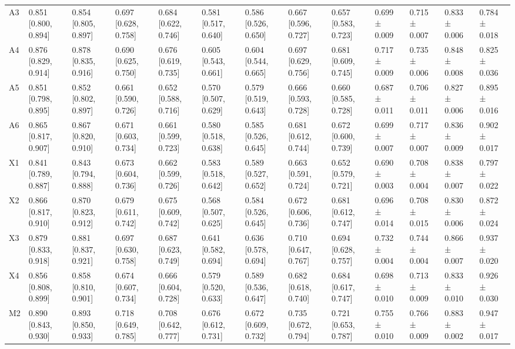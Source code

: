 \begin{table}
\begin{tabular}{lllllllllllll}
A3 & 0.851 [0.800, 0.894] & 0.854 [0.805, 0.897] & 0.697 [0.628, 0.758] & 0.684 [0.622, 0.746] & 0.581 [0.517, 0.640] & 0.586 [0.526, 0.650] & 0.667 [0.596, 0.727] & 0.657 [0.583, 0.723] & 0.699 ± 0.009 & 0.715 ± 0.007 & 0.833 ± 0.006 & 0.784 ± 0.018 \\
A4 & 0.876 [0.829, 0.914] & 0.878 [0.835, 0.916] & 0.690 [0.625, 0.750] & 0.676 [0.619, 0.735] & 0.605 [0.543, 0.661] & 0.604 [0.544, 0.665] & 0.697 [0.629, 0.756] & 0.681 [0.609, 0.745] & 0.717 ± 0.009 & 0.735 ± 0.006 & 0.848 ± 0.008 & 0.825 ± 0.036 \\
A5 & 0.851 [0.798, 0.895] & 0.852 [0.802, 0.897] & 0.661 [0.590, 0.726] & 0.652 [0.588, 0.716] & 0.570 [0.507, 0.629] & 0.579 [0.519, 0.643] & 0.666 [0.593, 0.728] & 0.660 [0.585, 0.728] & 0.687 ± 0.011 & 0.706 ± 0.011 & 0.827 ± 0.006 & 0.895 ± 0.016 \\
A6 & 0.865 [0.817, 0.907] & 0.867 [0.820, 0.910] & 0.671 [0.603, 0.734] & 0.661 [0.599, 0.723] & 0.580 [0.518, 0.638] & 0.585 [0.526, 0.645] & 0.681 [0.612, 0.744] & 0.672 [0.600, 0.739] & 0.699 ± 0.007 & 0.717 ± 0.007 & 0.836 ± 0.009 & 0.902 ± 0.017 \\
X1 & 0.841 [0.789, 0.887] & 0.843 [0.794, 0.888] & 0.673 [0.604, 0.736] & 0.662 [0.599, 0.726] & 0.583 [0.518, 0.642] & 0.589 [0.527, 0.652] & 0.663 [0.591, 0.724] & 0.652 [0.579, 0.721] & 0.690 ± 0.003 & 0.708 ± 0.004 & 0.838 ± 0.007 & 0.797 ± 0.022 \\
X2 & 0.866 [0.817, 0.910] & 0.870 [0.823, 0.912] & 0.679 [0.611, 0.742] & 0.675 [0.609, 0.742] & 0.568 [0.507, 0.625] & 0.584 [0.526, 0.645] & 0.672 [0.606, 0.736] & 0.681 [0.612, 0.747] & 0.696 ± 0.014 & 0.708 ± 0.015 & 0.830 ± 0.006 & 0.872 ± 0.024 \\
X3 & 0.879 [0.833, 0.918] & 0.881 [0.837, 0.921] & 0.697 [0.630, 0.758] & 0.687 [0.623, 0.749] & 0.641 [0.582, 0.694] & 0.636 [0.578, 0.694] & 0.710 [0.647, 0.767] & 0.694 [0.628, 0.757] & 0.732 ± 0.004 & 0.744 ± 0.004 & 0.866 ± 0.007 & 0.937 ± 0.020 \\
X4 & 0.856 [0.808, 0.899] & 0.858 [0.810, 0.901] & 0.674 [0.607, 0.734] & 0.666 [0.604, 0.728] & 0.579 [0.520, 0.633] & 0.589 [0.536, 0.647] & 0.682 [0.618, 0.740] & 0.684 [0.617, 0.747] & 0.698 ± 0.010 & 0.713 ± 0.009 & 0.833 ± 0.010 & 0.926 ± 0.030 \\
M2 & 0.890 [0.843, 0.930] & 0.893 [0.850, 0.933] & 0.718 [0.649, 0.785] & 0.708 [0.642, 0.777] & 0.676 [0.612, 0.731] & 0.672 [0.609, 0.732] & 0.735 [0.672, 0.794] & 0.721 [0.653, 0.787] & 0.755 ± 0.010 & 0.766 ± 0.009 & 0.883 ± 0.002 & 0.947 ± 0.017 \\

\end{tabular}
\end{table}
